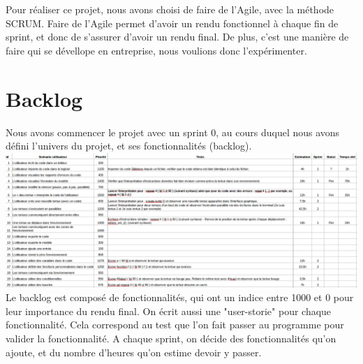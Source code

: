 Pour réaliser ce projet, nous avons choisi de faire de l'Agile, avec la méthode SCRUM. Faire de l'Agile permet d'avoir un rendu fonctionnel à chaque fin de sprint, et donc de s'assurer d'avoir un rendu final. De plus, c'est une manière de faire qui se dévellope en entreprise, nous voulions donc l'expérimenter.
\section{Backlog}
Nous avons commencer le projet avec un sprint 0, au cours duquel nous avons défini l'univers du projet, et ses fonctionnalités (backlog).\\

\includegraphics[scale=0.3]{doc/report/uml/backlogv1.png}
Le backlog est composé de fonctionnalités, qui ont un indice entre 1000 et 0 pour leur importance du rendu final. On écrit aussi une "user-storie" pour chaque fonctionnalité. Cela correspond au test que l'on fait passer au programme pour valider la fonctionnalité.
A chaque sprint, on décide des fonctionnalités qu'on ajoute, et du nombre d'heures qu'on estime devoir y passer.\\

